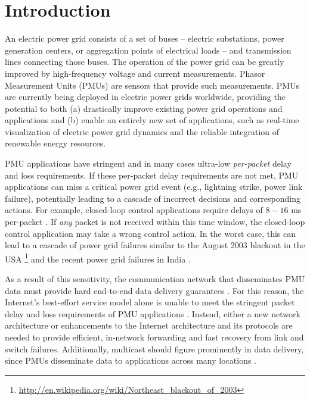 \section{Introduction}
\label{sec:intro}


An electric power grid consists of a set of buses  -- electric substations, power generation centers, or aggregation points of electrical loads -- and transmission lines connecting those buses.
The operation of the power grid can be greatly improved by high-frequency voltage and current measurements. Phasor Measurement Units (PMUs) are  
sensors that provide such measurements. PMUs are currently being deployed in electric power grids worldwide, providing the potential to both 
(a) drastically improve existing power grid operations and applications and (b) enable an entirely new set of applications,
such as real-time visualization of electric power grid dynamics and the reliable integration of renewable energy resources. 

PMU applications have stringent and in many cases ultra-low \emph{per-packet} delay and loss requirements.  
If these per-packet delay requirements are not met, PMU applications can miss a critical power grid event (e.g., lightning strike, power link failure), potentially leading to a 
cascade of incorrect decisions and corresponding actions. For example, closed-loop control applications require delays of $8-16$ ms per-packet \cite{Bakken11}. 
If \emph{any} packet is not received within this time window, the closed-loop control application may take a wrong control action.
In the worst case, this can lead to a cascade of power grid failures similar to the August 2003 blackout in the USA 
\footnote{\url{http://en.wikipedia.org/wiki/Northeast_blackout_of_2003}} and the recent power grid failures in India \cite{IndiaBlackout}. 


As a result of this sensitivity, the communication network that disseminates PMU data must provide hard end-to-end data delivery guarantees \cite{Bakken11}. 
For this reason, the Internet's best-effort service model alone is unable to meet the stringent packet delay and loss requirements of PMU applications \cite{Birman05}. 
Instead, either a new network architecture or enhancements to the Internet architecture and its protocols are needed \cite{Bakken11,Birman05,Naspi10,Hopkinson09} to provide efficient, in-network forwarding and fast recovery from link and switch failures. 
Additionally, multicast should figure prominently in data  delivery, since PMUs disseminate  data  to applications across many locations \cite{Bakken11}.

